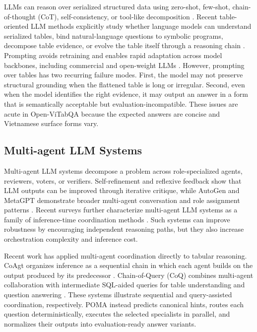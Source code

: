 \documentclass[]{interact}
\begin{document}
LLMs can reason over serialized structured data using zero-shot, few-shot, chain-of-thought (CoT), self-consistency, or tool-like decomposition \citep{brown-etal-2020-language,wei-etal-2022-chain,wang-etal-2023-selfconsistency,yao-etal-2023-react}. Recent table-oriented LLM methods explicitly study whether language models can understand serialized tables, bind natural-language questions to symbolic programs, decompose table evidence, or evolve the table itself through a reasoning chain \citep{sui-etal-2024-table,cheng-etal-2023-binder,ye-etal-2023-dater,wang-etal-2024-chain}. Prompting avoids retraining and enables rapid adaptation across model backbones, including commercial and open-weight LLMs \citep{openai-2024-gpt4,dubey-etal-2024-llama,qwen-team-2025-qwen3}. However, prompting over tables has two recurring failure modes. First, the model may not preserve structural grounding when the flattened table is long or irregular. Second, even when the model identifies the right evidence, it may output an answer in a form that is semantically acceptable but evaluation-incompatible. These issues are acute in Open-ViTabQA because the expected answers are concise and Vietnamese surface forms vary.

\subsection{Multi-agent LLM Systems}

Multi-agent LLM systems decompose a problem across role-specialized agents, reviewers, voters, or verifiers. Self-refinement and reflexive feedback show that LLM outputs can be improved through iterative critique, while AutoGen and MetaGPT demonstrate broader multi-agent conversation and role assignment patterns \citep{madaan-etal-2023-selfrefine,shinn-etal-2023-reflexion,wu-etal-2023-autogen,hong-etal-2024-metagpt}. Recent surveys further characterize multi-agent LLM systems as a family of inference-time coordination methods \citep{guo-etal-2024-multiagent}. Such systems can improve robustness by encouraging independent reasoning paths, but they also increase orchestration complexity and inference cost.

Recent work has applied multi-agent coordination directly to tabular reasoning. CoAgt organizes inference as a sequential chain in which each agent builds on the output produced by its predecessor \citep{alrayzah-alqhtani-2025-coagt}. Chain-of-Query (CoQ) combines multi-agent collaboration with intermediate SQL-aided queries for table understanding and question answering \citep{sui-etal-2025-coq}. These systems illustrate sequential and query-assisted coordination, respectively. POMA instead predicts canonical hints, routes each question deterministically, executes the selected specialists in parallel, and normalizes their outputs into evaluation-ready answer variants.
\end{document}
